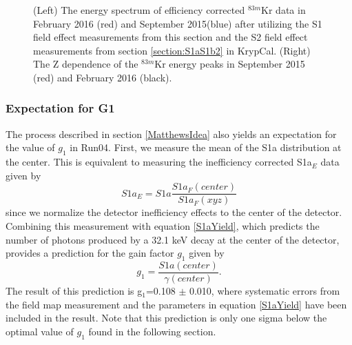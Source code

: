 \documentclass[a4paper,12pt]{article}
\begin{document}
{\begin{figure} [h!]
\centering
{}
\qquad
{}
\caption{ (Left) The energy spectrum of efficiency corrected  $^{83m}$Kr data in February 2016 (red) and September 2015(blue) after utilizing the S1 field effect measurements from this section and the S2 field effect measurements from section \ref{section:S1aS1b2} in KrypCal. (Right) The Z dependence of the $^{83m}$Kr energy peaks in September 2015 (red) and February 2016 (black).}
\label{ShittyKr2}
\end{figure}


\subsubsection{Expectation for G1}\label{G1pred}

The process described in section \ref{MatthewsIdea} also yields an expectation for the value of $g_1$ in Run04.  First, we measure the mean of the S1a distribution at the center.  This is equivalent to measuring the inefficiency corrected S1a$_E$ data given by 
\begin{equation}
S1a_E=S1a \frac{S1a_F(center)}{S1a_F(xyz)}
\end{equation}
since we normalize the detector inefficiency effects to the center of the detector.  Combining this measurement with equation \ref{S1aYield}, which predicts the number of photons produced by a 32.1 keV decay at the center of the detector, provides a prediction for the gain factor $g_1$ given by
\begin{equation}
g_1 = \frac{S1a(center)}{\gamma (center)}.
\end{equation}
The result of this prediction is g$_1$=0.108 $\pm$ 0.010, where systematic errors from the field map measurement and the parameters in equation  \ref{S1aYield} have been included in the result.  Note that this prediction is only one sigma below the optimal value of $g_1$ found in the following section.

}
\end{document}
